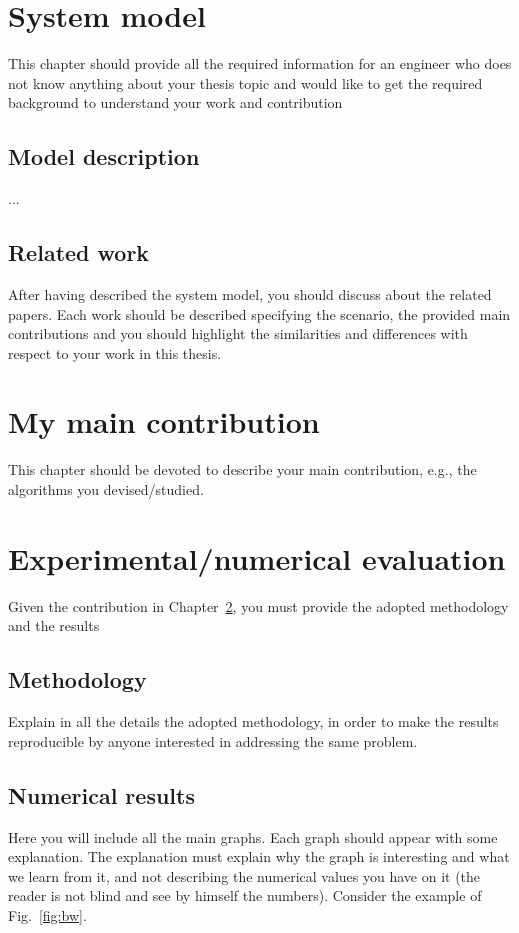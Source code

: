 \documentclass[a4paper,11pt,twoside,english]{toptesi}
\begin{document}
 
\chapter{System model}

This chapter should provide all the required information for an engineer who does not know anything about your thesis topic and would like to get the required background to understand your work and contribution
 
\section{Model description}
...  

\section{Related work}\label{sec:rel}
After having described the system model, you should discuss about the related papers. Each work should be described specifying the scenario, the provided main contributions and you should highlight the similarities and differences with respect to your work in this thesis.

\chapter{My main contribution}\label{sec:cont}
This chapter should be devoted to describe your main contribution, e.g., the algorithms you devised/studied.

\chapter{Experimental/numerical evaluation}
Given the contribution in Chapter~\ref{sec:cont}, you must provide the adopted methodology and the  results

\section{Methodology}
Explain in all the details the adopted methodology, in order to make the results reproducible by anyone interested in addressing the same problem.

\section{Numerical results}

Here you will include all the main graphs. Each graph should appear with some explanation. The explanation must explain why the graph is interesting and what we learn from it, and not describing the numerical values you have on it (the reader is not blind and see by himself the numbers). Consider the example of Fig.~\ref{fig:bw}.
\end{document}
